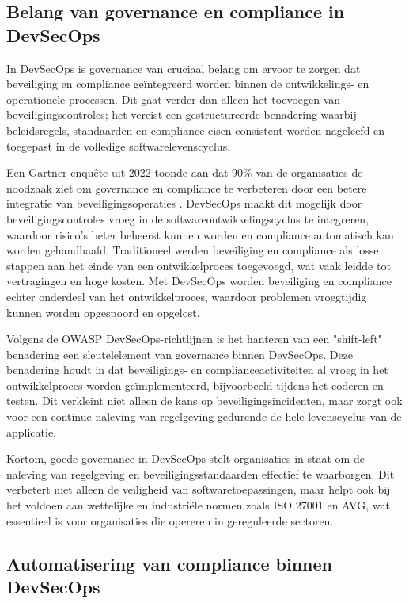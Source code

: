 \documentclass{hogent-article}
\begin{document}
   \subsection{Belang van governance en compliance in DevSecOps}
   
  In DevSecOps is governance van cruciaal belang om ervoor te zorgen dat beveiliging en compliance geïntegreerd worden binnen de ontwikkelings- en operationele processen. Dit gaat verder dan alleen het toevoegen van beveiligingscontroles; het vereist een gestructureerde benadering waarbij beleidsregels, standaarden en compliance-eisen consistent worden nageleefd en toegepast in de volledige softwarelevenscyclus.
  
  Een Gartner-enquête uit 2022 toonde aan dat 90\% van de organisaties de noodzaak ziet om governance en compliance te verbeteren door een betere integratie van beveiligingsoperaties \autocite{GlobalSign2022}. DevSecOps maakt dit mogelijk door beveiligingscontroles vroeg in de softwareontwikkelingscyclus te integreren, waardoor risico's beter beheerst kunnen worden en compliance automatisch kan worden gehandhaafd. Traditioneel werden beveiliging en compliance als losse stappen aan het einde van een ontwikkelproces toegevoegd, wat vaak leidde tot vertragingen en hoge kosten. Met DevSecOps worden beveiliging en compliance echter onderdeel van het ontwikkelproces, waardoor problemen vroegtijdig kunnen worden opgespoord en opgelost.
  
  Volgens de OWASP DevSecOps-richtlijnen is het hanteren van een "shift-left" benadering een sleutelelement van governance binnen DevSecOps. Deze benadering houdt in dat beveiligings- en complianceactiviteiten al vroeg in het ontwikkelproces worden geïmplementeerd, bijvoorbeeld tijdens het coderen en testen. Dit verkleint niet alleen de kans op beveiligingsincidenten, maar zorgt ook voor een continue naleving van regelgeving gedurende de hele levenscyclus van de applicatie.\autocite{Project2019}
  
  Kortom, goede governance in DevSecOps stelt organisaties in staat om de naleving van regelgeving en beveiligingsstandaarden effectief te waarborgen. Dit verbetert niet alleen de veiligheid van softwaretoepassingen, maar helpt ook bij het voldoen aan wettelijke en industriële normen zoals ISO 27001 en AVG, wat essentieel is voor organisaties die opereren in gereguleerde sectoren.
  
   
   \subsection{Automatisering van compliance binnen DevSecOps}
   
\end{document}
